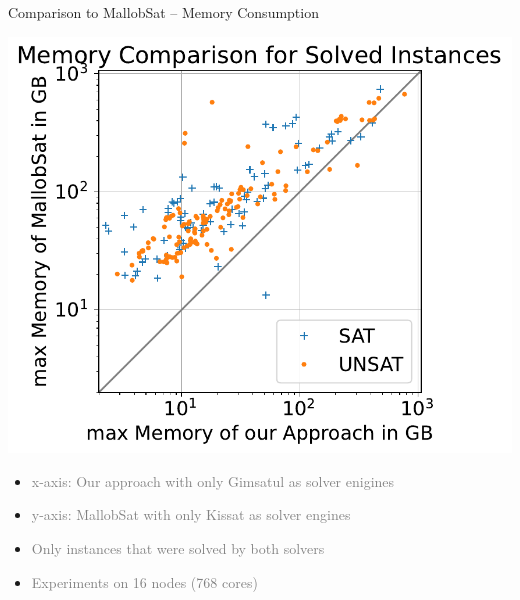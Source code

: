 \documentclass[]{sdqbeamer}
\begin{document}
\begin{frame}{Comparison to MallobSat -- Memory Consumption}
    \begin{minipage}{.45\textwidth}
        \center
        \includegraphics[scale=.8]{plots/square_mem_compare/square_mem_16node.pdf}\\
    \end{minipage}
    \hfill
    \begin{minipage}{.45\textwidth}
        \begin{itemize}
            \item \textcolor{gray}{x-axis: Our approach with only Gimsatul as solver enigines}
            \item \textcolor{gray}{y-axis: MallobSat with only Kissat as solver engines}
            \item \textcolor{gray}{Only instances that were solved by both solvers}
            \item \textcolor{gray}{Experiments on 16 nodes (768 cores)}
        \end{itemize}
    \end{minipage}
\end{frame}
\end{document}
